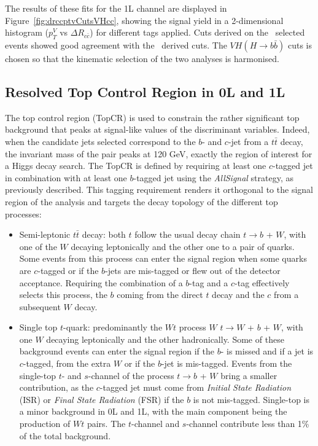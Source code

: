The results of these fits for the 1L channel are displayed in Figure~\ref{fig:drccptvCutsVHcc}, showing the signal yield in a 2-dimensional histogram ($p_T^V$ vs $\Delta R_{c\bar{c}}$) for different tags applied. Cuts derived on the \vhc\ selected events showed good agreement with the \vhb\ derived cuts. The $VH(H\rightarrow b\bar{b})$ cuts is chosen so that the kinematic selection of the two analyses is harmonised. \\

\subsection{Resolved Top Control Region in 0L and 1L}
The top control region (TopCR) is used to constrain the rather significant top background that peaks at signal-like values of the discriminant variables. Indeed, when the candidate jets selected correspond to the $b$- and $c$-jet from a $t\bar{t}$ decay, the invariant mass of the pair peaks at 120 GeV, exactly the region of interest for a Higgs decay search. The TopCR is defined by requiring at least one $c$-tagged jet in combination with at least one $b$-tagged jet using the \textit{AllSignal} strategy, as previously described. This tagging requirement renders it orthogonal to the signal region of the analysis and targets the decay topology of the different top processes: 
\begin{itemize}
\item Semi-leptonic $t\bar{t}$ decay: both $t$ follow the usual decay chain  $t \rightarrow b$ + $W$, with one of the $W$ decaying leptonically and the other one to a pair of quarks. Some events from this process can enter the signal region when some quarks are $c$-tagged or if the $b$-jets are mis-tagged or flew out of the detector acceptance. Requiring the combination of a $b$-tag and a $c$-tag effectively selects this process, the $b$ coming from the direct $t$ decay and the $c$ from a subsequent $W$ decay. 
\item Single top $t$-quark: predominantly the $Wt$ process $W$ $t \rightarrow W$ +  $b$ + $W$, with one $W$ decaying leptonically and the other hadronically. Some of these background events can enter the signal region if the $b$- is missed and if a jet is $c$-tagged, from the extra $W$ or if the $b$-jet is mis-tagged. Events from the single-top $t$- and $s$-channel of the process $t \rightarrow b$ + $W$ bring a smaller contribution, as the $c$-tagged jet must come from \textit{Initial State Radiation} (ISR) or \textit{Final State Radiation} (FSR) if the $b$ is not mis-tagged. Single-top is a minor background in 0L and 1L, with the main component being the production of $Wt$ pairs. The $t$-channel and $s$-channel contribute less than 1\% of the total background.
\end{itemize}

